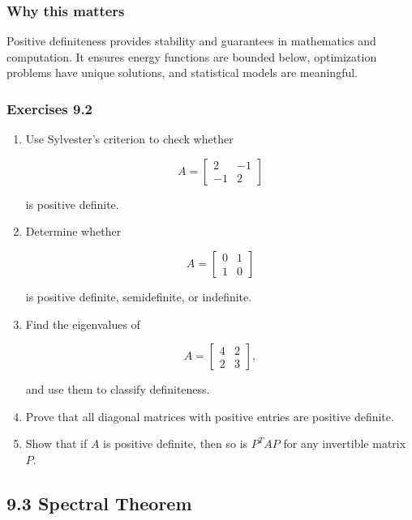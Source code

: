 \documentclass[
  12pt,
  a4paper,
]{article}
\begin{document}
\subsubsection{Why this matters}\label{why-this-matters-33}

Positive definiteness provides stability and guarantees in mathematics
and computation. It ensures energy functions are bounded below,
optimization problems have unique solutions, and statistical models are
meaningful.

\subsubsection{Exercises 9.2}\label{exercises-92}

\begin{enumerate}
\def\labelenumi{\arabic{enumi}.}
\item
  Use Sylvester's criterion to check whether

  \[A = \begin{bmatrix} 2 & -1 \\ -1 & 2 \end{bmatrix}\]

  is positive definite.
\item
  Determine whether

  \[A = \begin{bmatrix} 0 & 1 \\ 1 & 0 \end{bmatrix}\]

  is positive definite, semidefinite, or indefinite.
\item
  Find the eigenvalues of

  \[A = \begin{bmatrix} 4 & 2 \\ 2 & 3 \end{bmatrix},\]

  and use them to classify definiteness.
\item
  Prove that all diagonal matrices with positive entries are positive
  definite.
\item
  Show that if \(A\) is positive definite, then so is \(P^T A P\) for
  any invertible matrix \(P\).
\end{enumerate}

\subsection{9.3 Spectral Theorem}\label{93-spectral-theorem}
\end{document}
